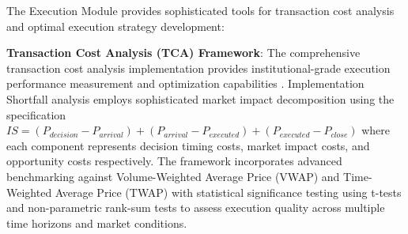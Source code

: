 \documentclass[12pt,a4paper]{article}
\theoremstyle{definition}
\theoremstyle{remark}
\begin{document}
The Execution Module provides sophisticated tools for transaction cost analysis and optimal execution strategy development:

\textbf{Transaction Cost Analysis (TCA) Framework}: The comprehensive transaction cost analysis implementation provides institutional-grade execution performance measurement and optimization capabilities \citep{almgren2001optimal}. Implementation Shortfall analysis employs sophisticated market impact decomposition using the specification $IS = (P_{decision} - P_{arrival}) + (P_{arrival} - P_{executed}) + (P_{executed} - P_{close})$ where each component represents decision timing costs, market impact costs, and opportunity costs respectively. The framework incorporates advanced benchmarking against Volume-Weighted Average Price (VWAP) and Time-Weighted Average Price (TWAP) with statistical significance testing using t-tests and non-parametric rank-sum tests to assess execution quality across multiple time horizons and market conditions.
\end{document}
